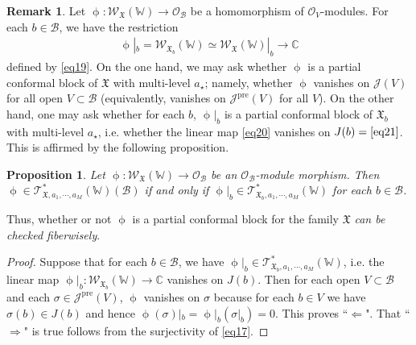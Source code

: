 \documentclass[11pt,b5paper,notitlepage]{article}
\theoremstyle{definition}
\newtheorem{rem}[df]{Remark}
\theoremstyle{plain}
\newtheorem{pp}[df]{Proposition}
\newcommand{\fk}{\mathfrak}
\newcommand{\mc}{\mathcal}
\newcommand{\scr}{\mathscr}
\newcommand{\Wbb}{\mathbb W}
\newcommand{\Cbb}{\mathbb C}
\newcommand{\<}{\left\langle}
\renewcommand{\>}{\right\rangle}
\newcommand{\MO}{\mathcal{O}}
\newcommand{\fx}{\mathfrak{X}}
\newcommand{\ST}{\mathscr{T}}
\newcommand{\SW}{\mathscr{W}}
\newcommand{\pre}{\mathrm{pre}}
\numberwithin{equation}{section}
\begin{document}
\begin{rem}
Let $\upphi:\SW_\fx(\Wbb)\rightarrow \MO_{\mc B}$ be a homomorphism of $\MO_V$-modules. For each $b\in \mc B$, we have the restriction
\begin{align}\label{eq20}
\upphi|_b=\scr W_{\fk X_b}(\Wbb)\simeq \scr W_{\fk X}(\Wbb)|_b\rightarrow\Cbb
\end{align}
defined by \eqref{eq19}. On the one hand, we may ask whether $\upphi$ is a partial conformal block of $\fk X$ with multi-level $a_\star$; namely, whether $\upphi$ vanishes on $\scr J(V)$ for all open $V\subset\mc B$ (equivalently, vanishes on $\scr J^\pre(V)$ for all $V$). On the other hand, one may ask whether for each $b$, $\upphi|_b$ is a partial conformal block of $\fk X_b$ with multi-level $a_\star$, i.e. whether the linear map \eqref{eq20} vanishes on $J(b)=\eqref{eq21}$. This is affirmed by the following proposition.
\end{rem}





\begin{pp}\label{familyfiber5}
Let $\upphi:\SW_\fx(\Wbb)\rightarrow \MO_{\mc B}$ be an $\MO_{\mc B}$-module morphism. Then $\upphi\in \ST_{\fx,a_1,\cdots,a_M}^*(\Wbb)(\mc B)$ if and only if $\upphi\vert_b\in \ST_{\fx_b,a_1,\cdots,a_M}^*(\Wbb)$ for each $b\in \mc B$. 
\end{pp}

Thus, whether or not $\upphi$ is a partial conformal block for the family $\fk X$ \emph{can be checked fiberwisely}.

\begin{proof}
Suppose that for each $b\in \mc B$, we have $\upphi\vert_b\in \ST_{\fx_b,a_1,\cdots,a_M}^*(\Wbb)$, i.e. the linear map $\upphi|_b:\scr W_{\fk X_b}(\Wbb)\rightarrow\Cbb$ vanishes on $J(b)$. Then for each open $V\subset\mc B$ and each $\sigma\in\scr J^\pre(V)$, $\upphi$ vanishes on $\sigma$ because for each $b\in V$ we have $\sigma(b)\in J(b)$ and hence $\upphi(\sigma)|_b=\upphi|_b(\sigma|_b)=0$. This proves ``$\Leftarrow $". That ``$\Rightarrow$" is true follows from the surjectivity of \eqref{eq17}.
\end{proof}
\end{document}
